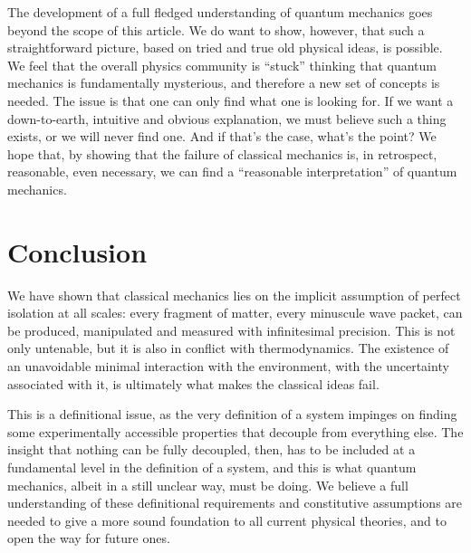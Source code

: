 \documentclass[10pt,twocolumn, nofootinbib]{revtex4-2}
\begin{document}
The development of a full fledged understanding of quantum mechanics goes beyond the scope of this article. We do want to show, however, that such a straightforward picture, based on tried and true old physical ideas, is possible. We feel that the overall physics community is ``stuck'' thinking that quantum mechanics is fundamentally mysterious, and therefore a new set of concepts is needed. The issue is that one can only find what one is looking for. If we want a down-to-earth, intuitive and obvious explanation, we must believe such a thing exists, or we will never find one. And if that's the case, what's the point?  We hope that, by showing that the failure of classical mechanics is, in retrospect, reasonable, even necessary, we can find a ``reasonable interpretation'' of quantum mechanics.

\section{Conclusion}

We have shown that classical mechanics lies on the implicit assumption of perfect isolation at all scales: every fragment of matter, every minuscule wave packet, can be produced, manipulated and measured with infinitesimal precision. This is not only untenable, but it is also in conflict with thermodynamics. The existence of an unavoidable minimal interaction with the environment, with the uncertainty associated with it, is ultimately what makes the classical ideas fail.

This is a definitional issue, as the very definition of a system impinges on finding some experimentally accessible properties that decouple from everything else. The insight that nothing can be fully decoupled, then, has to be included at a fundamental level in the definition of a system, and this is what quantum mechanics, albeit in a still unclear way, must be doing. We believe a full understanding of these definitional requirements and constitutive assumptions are needed to give a more sound foundation to all current physical theories, and to open the way for future ones.




\end{document}
